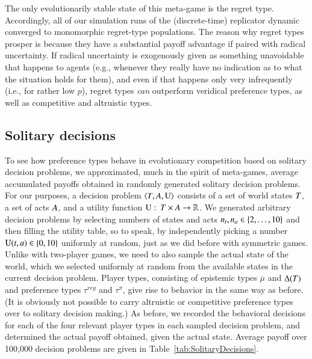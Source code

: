 \documentclass[fleqn,reqno,11pt]{article}
\begin{document}
The only evolutionarily stable state of this meta-game is the regret type. Accordingly, all of
our simulation runs of the (discrete-time) replicator dynamic converged to monomorphic
regret-type populations. The reason why regret types prosper is because they have a substantial
payoff advantage if paired with radical uncertainty. If radical uncertainty is exogenously
given as something unavoidable that happens to agents (e.g., whenever they really have no
indication as to what the situation holds for them), and even if that happens only very
infrequently (i.e., for rather low $p$), regret types \emph{can} outperform veridical
preference types, as well as competitive and altruistic types.


\subsection{Solitary decisions}
\label{sec:solitary-decisions}


To see how preference types behave in evolutionary competition based on solitary decision
problems, we approximated, much in the spirit of meta-games, average accumulated payoffs
obtained in randomly generated solitary decision problems. For our purposes, a decision problem
$\left \langle T, A, \operatorname{U}\right\rangle$ consists of a set of world states $T$, a set of acts
$A$, and a utility function $\operatorname{U} \thinspace \colon \thinspace T \times A \rightarrow
\mathbb{R}$.
We generated arbitrary decision problems by selecting numbers of states and acts
$n_t, n_a \in \left\{2, \dots, 10\right\}$ and then filling the utility table, so to speak, by
independently picking a number $\operatorname{U}(t, a) \in \left\{0, 10\right\}$ uniformly at random, just
as we did before with symmetric games. Unlike with two-player games, we need to also sample the
actual state of the world, which we selected uniformly at random from the available states in
the current decision problem. Player types, consisting of epistemic types $\overline{\mu}$ and
$\Delta(T)$ and preference types $\tau^{reg}$ and $\tau^{\pi}$, give rise to behavior in
the same way as before. (It is obviously not possible to carry altruistic or competitive
preference types over to solitary decision making.) As before, we recorded the behavioral
decisions for each of the four relevant player types in each sampled decision problem, and
determined the actual payoff obtained, given the actual state. Average payoff over 100,000 decision
problems are given in Table~\ref{tab:SolitaryDecisions}.
\end{document}
